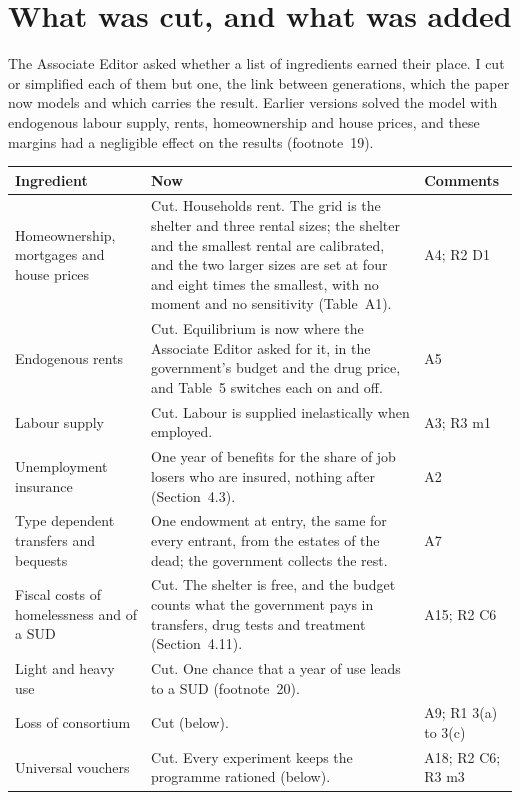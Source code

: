 \documentclass[11pt]{article}
\begin{document}
\section*{\color{respred}What was cut, and what was added}

{\color{respred}
The Associate Editor asked whether a list of ingredients earned their place. I cut or
simplified each of them but one, the link between generations, which the paper now models and
which carries the result. Earlier versions solved the model with endogenous labour supply,
rents, homeownership and house prices, and these margins had a negligible effect on the
results (footnote~19).

\begin{center}
\small
\begin{tabular}{@{}L{3.7cm}L{9.0cm}L{2.2cm}@{}}
\toprule
Ingredient & Now & Comments \\
\midrule
Homeownership, mortgages and house prices & Cut. Households rent. The grid is the shelter and
three rental sizes; the shelter and the smallest rental are calibrated, and the two larger
sizes are set at four and eight times the smallest, with no moment and no sensitivity
(Table~A1). & A4; R2 D1 \\[0.3em]
Endogenous rents & Cut. Equilibrium is now where the Associate Editor asked for it, in the
government's budget and the drug price, and Table~5 switches each on and off. & A5 \\[0.3em]
Labour supply & Cut. Labour is supplied inelastically when employed. & A3; R3 m1 \\[0.3em]
Unemployment insurance & One year of benefits for the share of job losers who are insured,
nothing after (Section~4.3). & A2 \\[0.3em]
Type dependent transfers and bequests & One endowment at entry, the same for every entrant,
from the estates of the dead; the government collects the rest. & A7 \\[0.3em]
Fiscal costs of homelessness and of a SUD & Cut. The shelter is free, and the budget counts
what the government pays in transfers, drug tests and treatment (Section~4.11). & A15;
R2 C6 \\[0.3em]
Light and heavy use & Cut. One chance that a year of use leads to a SUD (footnote~20). &
\\[0.3em]
Loss of consortium & Cut (below). & A9; R1 3(a) to 3(c) \\[0.3em]
Universal vouchers & Cut. Every experiment keeps the programme rationed (below). & A18;
R2 C6; R3 m3 \\
\bottomrule
\end{tabular}
\end{center}

}
\end{document}
